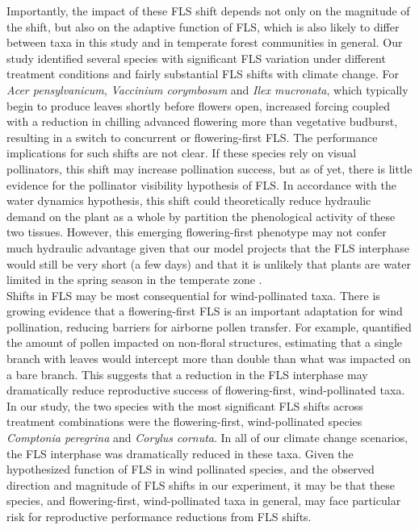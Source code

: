 \documentclass[11pt]{article}
\begin{document}
\noindent Importantly, the impact of these FLS shift depends not only on the magnitude of the shift, but also on the adaptive function of FLS, which is also likely to differ between taxa in this study and in temperate forest communities in general. Our study identified several species with significant FLS variation under different treatment conditions and fairly substantial FLS shifts with climate change. For \textit{Acer pensylvanicum}, \textit{Vaccinium corymbosum} and \textit{Ilex mucronata}, which typically begin to produce leaves shortly before flowers open, increased forcing coupled with a reduction in chilling advanced flowering more than vegetative budburst, resulting in a switch to concurrent or flowering-first FLS. The performance implications for such shifts are not clear. If these species rely on visual pollinators, this shift may increase pollination success, but as of yet, there is little evidence for the pollinator visibility hypothesis of FLS. In accordance with the water dynamics hypothesis, this shift could theoretically reduce hydraulic demand on the plant as a whole by partition the phenological activity of these two tissues. However, this emerging flowering-first phenotype may not confer much hydraulic advantage given that our model projects that the FLS interphase would still be very short (a few days) and that it is unlikely that plants are water limited in the spring season in the temperate zone \citep{Polgar2011}.\\

\noindent Shifts in FLS may be most consequential for wind-pollinated taxa. There is growing evidence that a flowering-first FLS is an important adaptation for wind pollination, reducing barriers for airborne pollen transfer\citep{Rathcke_1985}. For example, \citet{Tauber1967} quantified the amount of pollen impacted on non-floral structures, estimating that a single branch with leaves would intercept more than double than what was impacted on a bare branch. This suggests that a reduction in the FLS interphase may dramatically reduce reproductive success of flowering-first, wind-pollinated taxa.\\

\noindent In our study, the two species with the most significant FLS shifts across treatment combinations were the flowering-first, wind-pollinated species \textit{Comptonia peregrina} and \textit{Corylus cornuta}. In all of our climate change scenarios, the FLS interphase was dramatically reduced in these taxa. Given the hypothesized function of FLS in wind pollinated species, and the observed direction and magnitude of FLS shifts in our experiment, it may be that these species, and flowering-first, wind-pollinated taxa in general, may face particular risk for reproductive performance reductions from FLS shifts.\\
\end{document}

